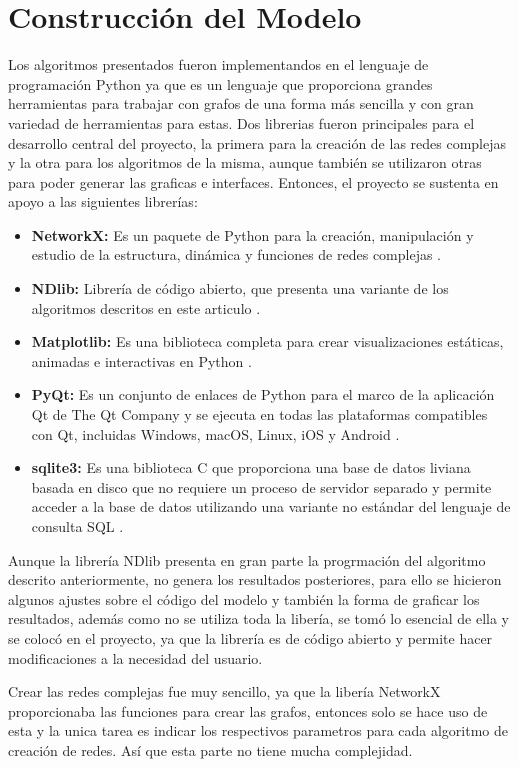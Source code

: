 \documentclass{article}
\begin{document}
\section{Construcción del Modelo}
Los algoritmos presentados fueron implementandos en el lenguaje de programación Python ya que es un lenguaje que proporciona grandes herramientas para trabajar con grafos de una forma más sencilla y con gran variedad de herramientas para estas. 
Dos librerias fueron principales para el desarrollo central del proyecto, la primera para la creación de las redes complejas y la otra para los algoritmos de la misma, aunque también se utilizaron otras para poder generar las graficas e interfaces. Entonces, el proyecto se sustenta en apoyo a las siguientes librerías:
\begin{itemize}
\item \textbf{NetworkX:} Es un paquete de Python para la creación, manipulación y estudio de la estructura, dinámica y funciones de redes complejas \cite{networkx:2020}.
\item \textbf{NDlib:} Librería de código abierto, que presenta una variante de los algoritmos descritos en este articulo \cite{ndlib:2020}. 
\item \textbf{Matplotlib:} Es una biblioteca completa para crear visualizaciones estáticas, animadas e interactivas en Python \cite{matplotlib:2020}. 
\item \textbf{PyQt:} Es un conjunto de enlaces de Python para el marco de la aplicación Qt de The Qt Company y se ejecuta en todas las plataformas compatibles con Qt, incluidas Windows, macOS, Linux, iOS y Android \cite{pyqt:2020}.
\item \textbf{sqlite3:} Es una biblioteca C que proporciona una base de datos liviana basada en disco que no requiere un proceso de servidor separado y permite acceder a la base de datos utilizando una variante no estándar del lenguaje de consulta SQL \cite{sqlite:2020}.
\end{itemize}

Aunque la librería NDlib presenta en gran parte la progrmación del algoritmo descrito anteriormente, no genera los resultados posteriores, para ello se hicieron algunos ajustes sobre el código del modelo y también la forma de graficar los resultados, además como no se utiliza toda la libería, se tomó lo esencial de ella y se colocó en el proyecto, ya que la librería es de código abierto y permite hacer modificaciones a la necesidad del usuario. 

Crear las redes complejas fue muy sencillo, ya que la libería NetworkX proporcionaba las funciones para crear las grafos, entonces solo se hace uso de esta y la unica tarea es indicar los respectivos parametros para cada algoritmo de creación de redes. Así que esta parte no tiene mucha complejidad. 
\end{document}
